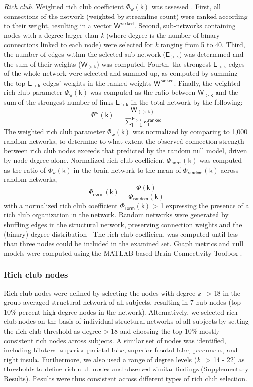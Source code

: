 \begin{refsection}
\noindent
\textit{Rich club.} Weighted rich club coefficient $\mathsf{\Phi_{w}(k)}$ was assessed \citep{Opsahl2008ProminenceAC}. First, all connections of the network (weighted by streamline count) were ranked according to their weight, resulting in a vector $\mathsf{W^{ranked}}$. Second, sub-networks containing nodes with a degree larger than \textit{k} (where degree is the number of binary connections linked to each node) were selected for \textit{k} ranging from 5 to 40. Third, the number of edges within the selected sub-network ($\mathsf{E_{>k}}$) was determined and the sum of their weights ($\mathsf{W_{>k}}$) was computed. Fourth, the strongest $\mathsf{E_{>k}}$ edges of the whole network were selected and summed up, as computed by summing the top $\mathsf{E_{>k}}$ edges' weights in the ranked weights $\mathsf{W^{ranked}}$. Finally, the weighted rich club parameter $\mathsf{\Phi_{w}(k)}$ was computed as the ratio between $\mathsf{W_{>k}}$ and the sum of the strongest number of links $\mathsf{E_{>k}}$ in the total network by the following:
\[\mathsf{\Phi^{w}(k)=\frac{W_(>k)}{\sum_{l=1}^{E_{>k}} w^{ranked}_{l}}}\]
The weighted rich club parameter $\mathsf{\Phi_{w}(k)}$ was normalized by comparing to 1,000 random networks, to determine to what extent the observed connection strength between rich club nodes exceeds that predicted by the random null model, driven by node degree alone. Normalized rich club coefficient $\mathsf{\Phi_{norm}(k)}$ was computed as the ratio of $\mathsf{\Phi_{w}(k)}$ in the brain network to the mean of $\mathsf{\Phi_{random}(k)}$ across random networks, 
\[\mathsf{\Phi_{norm}(k)=\frac{\Phi(k)}{\Phi_{random}(k)} }\]
with a normalized rich club coefficient $\mathsf{\Phi_{norm}(k)}$ > 1 expressing the presence of a rich club organization in the network. Random networks were generated by shuffling edges in the structural network, preserving connection weights and the (binary) degree distribution \citep{Maslov2002SpecificityAS}. The rich club coefficient was computed until less than three nodes could be included in the examined set. Graph metrics and null models were computed using the MATLAB-based Brain Connectivity Toolbox \citep{RUBINOV20101059}.

\subsubsection*{Rich club nodes}
Rich club nodes were defined by selecting the nodes with degree \textit{k} \ > 18 in the group-averaged structural network of all subjects, resulting in 7 hub nodes (top 10\% percent high degree nodes in the network). Alternatively, we selected rich club nodes on the basis of individual structural networks of all subjects by setting the rich club threshold as degree > 18 and choosing the top 10\% mostly consistent rich nodes across subjects. A similar set of nodes was identified, including bilateral superior parietal lobe, superior frontal lobe, precuneus, and right insula. Furthermore, we also used a range of degree levels (\textit{k} \ > 14 - 22) as thresholds to define rich club nodes and observed similar findings (Supplementary Results). Results were thus consistent across different types of rich club selection.


\end{refsection}
